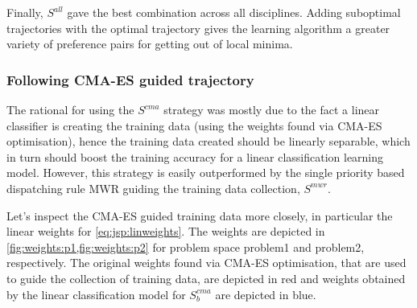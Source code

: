 Finally, $S^{all}$ gave the best combination across all disciplines. Adding suboptimal trajectories with the optimal trajectory gives the learning algorithm a greater variety of preference pairs for getting out of local minima.

\subsubsection{Following CMA-ES guided trajectory}
The rational for using the $S^{cma}$ strategy was mostly due to the fact a linear classifier is creating the training data (using the weights found via CMA-ES optimisation), hence the training data created should be linearly separable, which in turn should boost the training accuracy for a linear classification learning model. However, this strategy is easily outperformed by the single priority based dispatching rule MWR guiding the training data collection, $S^{mwr}$. 

Let's inspect the CMA-ES guided training data more closely, in particular the linear weights for \cref{eq:jsp:linweights}. The weights are depicted in \cref{fig:weights:p1,fig:weights:p2} for problem space problem{1} and problem{2}, respectively. The original weights found via CMA-ES optimisation, that are used to guide the collection of training data, are depicted in red and  weights obtained by the linear classification model for $S_b^{cma}$ are depicted in blue.


